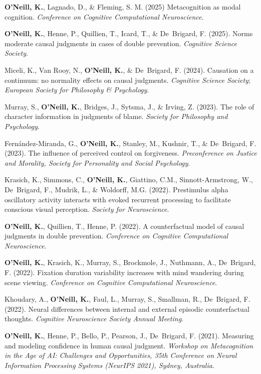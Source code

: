 \textbf{O'Neill, K.}, Lagnado, D., \& Fleming, S. M. (2025)
Metacognition as modal cognition. \emph{Conference on Cognitive
Computational Neuroscience}.

\textbf{O'Neill, K.}, Henne, P., Quillien, T., Icard, T., \&
De~Brigard, F. (2025). Norms moderate causal judgments in cases of
double prevention. \emph{Cognitive Science Society}.

Miceli, K., Van Rooy, N., \textbf{O'Neill, K.}, \& De~Brigard,
F. (2024). Causation on a continuum: no normality effects on causal
judgments. \emph{Cognitive Science Society}; \emph{European Society
for Philosophy \& Psychology}.

Murray, S., \textbf{O’Neill, K.}, Bridges, J., Sytsma, J., \& Irving,
Z. (2023). The role of character information in judgments of
blame. \emph{Society for Philosophy and Psychology}.

Fern\'{a}ndez-Miranda, G., \textbf{O’Neill, K.}, Stanley, M., Kushnir,
T., \& De~Brigard, F. (2023). The influence of perceived control on
forgiveness. \emph{Preconference on Justice and Morality, Society for
Personality and Social Psychology}.

Krasich, K., Simmons, C., \textbf{O'Neill, K.}, Giattino, C.M.,
Sinnott-Armstrong, W., De~Brigard, F., Mudrik, L., \& Woldorff,
M.G. (2022). Prestimulus alpha oscillatory activity interacts with
evoked recurrent processing to facilitate conscious visual
perception. \emph{Society for Neuroscience}.

\textbf{O'Neill, K.}, Quillien, T., Henne, P. (2022). A counterfactual
model of causal judgments in double prevention. \emph{Conference on
Cognitive Computational Neuroscience}.

\textbf{O'Neill, K.}, Krasich, K., Murray, S., Brockmole, J.,
Nuthmann, A., De~Brigard, F. (2022). Fixation duration variability
increases with mind wandering during scene viewing. \emph{Conference
on Cognitive Computational Neuroscience}.

Khoudary, A., \textbf{O’Neill, K.}, Faul, L., Murray, S., Smallman,
R., De~Brigard, F. (2022). Neural differences between internal and
external episodic counterfactual thoughts. \emph{Cognitive
Neuroscience Society Annual Meeting}.

\textbf{O'Neill, K.}, Henne, P., Bello, P., Pearson, J., De~Brigard,
F. (2021). Measuring and modeling confidence in human causal
judgment. \emph{Workshop on Metacognition in the Age of AI: Challenges
and Opportunities, 35th Conference on Neural Information Processing
Systems (NeurIPS 2021), Sydney, Australia}.

